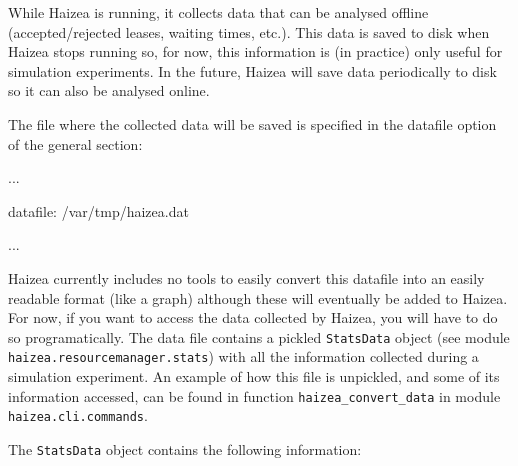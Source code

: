 While Haizea is running, it collects data that can be analysed offline (accepted/rejected leases, waiting times, etc.). This data is saved to disk when Haizea stops running so, for now, this information is (in practice) only useful for simulation experiments. In the future, Haizea will save data periodically to disk so it can also be analysed online.

The file where the collected data will be saved is specified in the datafile option of the general section:

\begin{wideshellverbatim}
[general]
...

datafile: /var/tmp/haizea.dat

...
\end{wideshellverbatim}

Haizea currently includes no tools to easily convert this datafile into an easily readable format (like a graph) although these will eventually be added to Haizea. For now, if you want to access the data collected by Haizea, you will have to do so programatically. The data file contains a pickled \texttt{StatsData} object (see module \texttt{haizea.resourcemanager.stats}) with all the information collected during a simulation experiment. An example of how this file is unpickled, and some of its information accessed, can be found in function \texttt{haizea\_convert\_data} in module \texttt{haizea.cli.commands}.

The \texttt{StatsData} object contains the following information:

